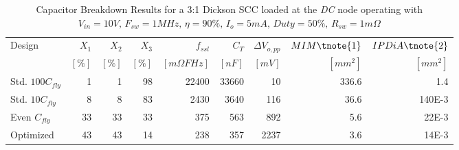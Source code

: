 \begin{table}[!h]
    \renewcommand{\arraystretch}{1.3}
    \begin{threeparttable}
    \centering
    \caption{Capacitor Breakdown Results for a 3:1 Dickson SCC loaded at the \emph{DC} node operating with
             $V_{in} = 10V, \,  F_{sw} = 1MHz, \, \eta=90\%, \, I_o =5mA , \, Duty = 50\% ,\, R_{sw}=1m \Omega$   }
    \label{tab:hscc_results}
    \begin{tabular}{ l | r | r | r || r | r | r || r | r }
      Design              & $X_1$   & $X_2$ & $X_3$   &  $f_{ssl}$          & $C_T$    & $\Delta V_{o,pp}$ & $ MIM\tnote{1} $  & $IPDiA \tnote{2}$ \\
                          &  $[\%]$ & $[\%]$ & $[\%]$ &  $[m\Omega F Hz]$  & $[nF]$    &   $[mV]$   & $[mm^2]$   & $[mm^2]$         \\
                          \hline \hline
      Std. $100 C_{fly}$  &  1   &   1  &  98   &   22400     &  33660    &    10  & 336.6 &    1.4     \\   \hline
      Std. $10 C_{fly}$   &  8   &   8  &  83   &    2430     &   3640    &   116  &  36.6  &   140E-3  \\   \hline
      Even $C_{fly}$      &  33  &  33  &  33   &     375     &    563    &   892  &   5.6  &   22E-3   \\   \hline
      Optimized           &  43  &  43  &  14   &     238     &    357    &  2237  &   3.6  &   14E-3   \\

    \end{tabular}
    \end{threeparttable}
\end{table}


